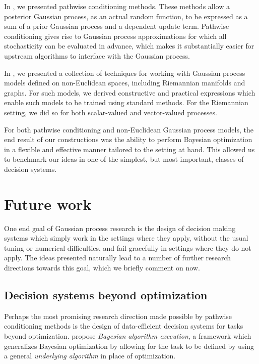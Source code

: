 \documentclass[11pt]{book}
\begin{document}
In , we presented pathwise conditioning methods.
These methods allow a posterior Gaussian process, as an actual random function, to be expressed as a sum of a prior Gaussian process and a dependent update term.
Pathwise conditioning gives rise to Gaussian process approximations for which all stochasticity can be evaluated in advance, which makes it substantially easier for upstream algorithms to interface with the Gaussian process.

In , we presented a collection of techniques for working with Gaussian process models defined on non-Euclidean spaces, including Riemannian manifolds and graphs. 
For such models, we derived constructive and practical expressions which enable such models to be trained using standard methods.
For the Riemannian setting, we did so for both scalar-valued and vector-valued processes.

For both pathwise conditioning and non-Euclidean Gaussian process models, the end result of our constructions was the ability to perform Bayesian optimization in a flexible and effective manner tailored to the setting at hand.
This allowed us to benchmark our ideas in one of the simplest, but most important, classes of decision systems.

\section{Future work}

One end goal of Gaussian process research is the design of decision making systems which simply work in the settings where they apply, without the usual tuning or numerical difficulties, and fail gracefully in settings where they do not apply.
The ideas presented naturally lead to a number of further research directions towards this goal, which we briefly comment on now.

\subsection*{Decision systems beyond optimization}

Perhaps the most promising research direction made possible by pathwise conditioning methods is the design of data-efficient decision systems for tasks beyond optimization.
\textcite{neiswanger21} propose \emph{Bayesian algorithm execution}, a framework which generalizes Bayesian optimization by allowing for the task to be defined by using a general \emph{underlying algorithm} in place of optimization.
\end{document}
